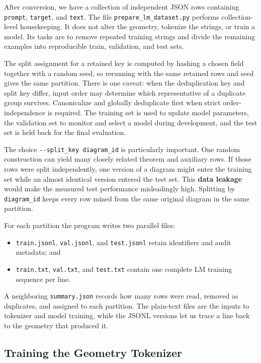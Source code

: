 \documentclass[reqno]{amsart}
\newcommand{\keyterm}[1]{\textbf{\color{agblue}#1}}
\DeclareMathOperator{\1}{\textbf{1}}
\begin{document}
After conversion, we have a collection of independent JSON rows containing
\verb|prompt|, \verb|target|, and \verb|text|.  The file
\verb|prepare_lm_dataset.py| performs collection-level housekeeping.  It does
not alter the geometry, tokenize the strings, or train a model.  Its tasks are
to remove repeated training strings and divide the remaining examples into
reproducible train, validation, and test sets.

The split assignment for a retained key is computed by hashing a chosen field
together with a random seed, so rerunning with the same retained rows and seed
gives the same partition. There is one caveat: when the deduplication key and
split key differ, input order may determine which representative of a duplicate
group survives. Canonicalize and globally deduplicate first when strict
order-independence is required.
The training set is used to update model parameters, the validation set to
monitor and select a model during development, and the test set is held back
for the final evaluation.

The choice \verb|--split_key diagram_id| is particularly important.  One
random construction can yield many closely related theorem and auxiliary
rows.  If those rows were split independently, one version of a diagram might
enter the training set while an almost identical version entered the test
set.  This \keyterm{data leakage} would make the measured test performance
misleadingly high.  Splitting by \verb|diagram_id| keeps every row mined from
the same original diagram in the same partition.

For each partition the program writes two parallel files:
\begin{itemize}
    \item \verb|train.jsonl|, \verb|val.jsonl|, and \verb|test.jsonl| retain
          identifiers and audit metadata; and
    \item \verb|train.txt|, \verb|val.txt|, and \verb|test.txt| contain one
          complete LM training sequence per line.
\end{itemize}
A neighboring \verb|summary.json| records how many rows were read, removed as
duplicates, and assigned to each partition.  The plain-text files are the
inputs to tokenizer and model training, while the JSONL versions let us trace
a line back to the geometry that produced it.

\subsection{Training the Geometry Tokenizer}
\end{document}
